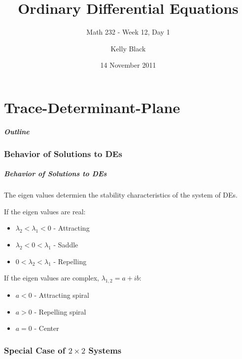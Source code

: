 \part{Trace-Determinant-Plane}


\title{Ordinary Differential Equations}
\subtitle{Math 232 - Week 12, Day 1}

\author{Kelly Black}
\date{14 November 2011}

\begin{frame}
  \titlepage
\end{frame}

\begin{frame}
  \frametitle{Outline}
\end{frame}


\section{Behavior of Solutions to DEs}


\begin{frame}
  \frametitle{Behavior of Solutions to DEs}

  The eigen values determien the stability characteristics of the
  system of DEs.

  If the eigen values are real:
  \begin{itemize}
  \item $\lambda_2 < \lambda_1 < 0$ - Attracting
  \item $\lambda_2 < 0 < \lambda_1$ - Saddle
  \item $0 < \lambda_2 < \lambda_1$ - Repelling
  \end{itemize}

  If the eigen values are complex, $\lambda_{1,2}=a+ib$:
  \begin{itemize}
  \item $a<0$ - Attracting spiral
  \item $a>0$ - Repelling spiral
  \item $a=0$ - Center
  \end{itemize}

\end{frame}

\section{Special Case of $2\times 2$ Systems}

